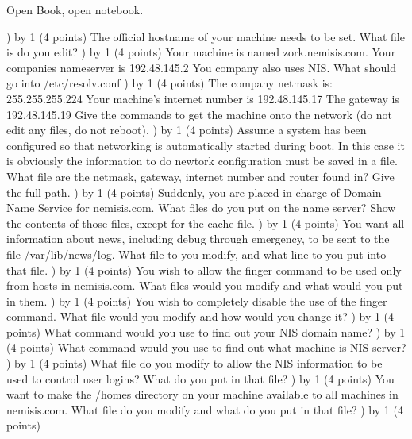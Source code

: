
\parindent=0in
\nopagenumbers
\newcount\quesno
{}
\def\ques{\number\quesno) \advance\quesno by 1}
\def\aspace{\vskip 1.5in}

Open Book, open notebook.

\ques
(4 points)
The official hostname of your machine needs to be set.
What file is do you edit?
\vskip 0.5in
\ques
(4 points)
Your machine is named {\ltt{}zork.nemisis.com}.
Your companies nameserver is {\ltt{}192.48.145.2}
You company also uses NIS.
What should go into {\ltt{}/etc/resolv.conf}
\vskip 2.5in
\ques
(4 points)
The company netmask is: {\ltt{}255.255.255.224}
Your machine's internet number is {\ltt{}192.48.145.17}
The gateway is {\ltt{}192.48.145.19}
Give the commands to get the machine onto the network (do not edit
any files, do not reboot).
\vskip 3.2in
\ques
(4 points)
Assume a system has been configured so that networking is automatically
started during boot.
In this case it is obviously the information to do newtork configuration must 
be saved in a file.
What file are the netmask, gateway, internet number and router
found in? Give the full path.
\vfill\eject
\ques
(4 points)
Suddenly, you are placed in charge of Domain Name Service for
{\ltt{}nemisis.com}.
What files do you put on the name server?
Show the contents of those files, except for the cache file.
\vskip 3.5in
\ques
(4 points)
You want all information about news, including debug through emergency,
to be sent to the file {\ltt{}/var/lib/news/log}.
What file to you modify, and what line to you put into that file.
\vskip 1.0in
\ques
(4 points)
You wish to allow the {\ltt{}finger} command to be used only
from hosts in {\ltt{}nemisis.com}.
What files would you modify and what would you put in them.
\vskip 1.0in
\ques
(4 points)
You wish to completely disable the use of the {\ltt{}finger} command.
What file would you modify and how would you change it?
\vskip 1.0in
\ques
(4 points)
What command would you use to find out your NIS domain name?
\vskip 0.5in
\ques
(4 points)
What command would you use to find out what machine is NIS server?
\vskip 0.5in
\ques
(4 points)
What file do you modify to allow the NIS information to be used to control
user logins?
What do you put in that file?
\vskip 1.2in
\ques
(4 points)
You want to make the {\ltt{}/homes} directory on your machine available
to all machines in {\ltt{}nemisis.com}.
What file do you modify and what do you put in that file?
\vskip 1.0in
\ques
(4 points)
